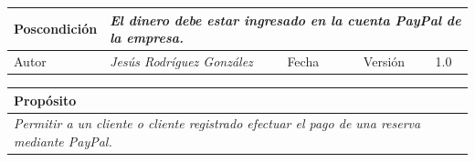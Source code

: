 \begin{table}[H]
\begin{tabular}{llllllll}
        \multicolumn{1}{|l|}{Poscondición}                           & \multicolumn{7}{p{10cm}|}{{\color[HTML]{808080} \textit{El dinero debe estar ingresado en la cuenta PayPal de la empresa.}}}                                                                                                                                                                                                                                                       \\ \hline
        \multicolumn{1}{|l|}{Autor}                                  & \multicolumn{1}{l|}{{\color[HTML]{808080} \textit{Jesús Rodríguez González}}}                           & \multicolumn{2}{l|}{Fecha}                                                   & \multicolumn{1}{l|}{}                          & \multicolumn{2}{l|}{Versión}                                                      & \multicolumn{1}{l|}{1.0}                                                     \\ \hline
        \end{tabular}
    \end{table}

    \begin{table}[H]
        \begin{tabular}{llllllll}
    \hline
    \multicolumn{8}{|l|}{\cellcolor[HTML]{F2F2F2}Propósito}                                                                                                                                                                                                                                                                                                                                                                                           \\ \hline
    \multicolumn{8}{|p{15cm}|}{{\color[HTML]{808080} \textit{Permitir a un cliente o cliente registrado efectuar el pago de una reserva mediante PayPal.}}}                                                                                                                                                                                                             \\ \hline
    \end{tabular}
    \end{table}

